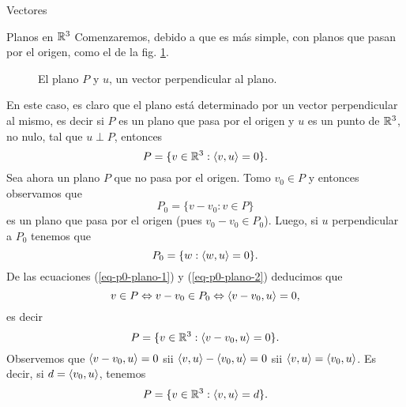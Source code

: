 \begin{chapter}{Vectores}
\begin{section}{Planos en $\mathbb R^3$}
        Comenzaremos, debido a que es más simple, con planos que  pasan por el origen,  como el de la fig. \ref{fig-plano-por-origen}.
        \begin{figure}[h]
        	\centering
            \caption{El plano $P$ y $u$, un vector  perpendicular al plano.}
            \label{fig-plano-por-origen}
        \end{figure} 
    
        En  este caso,  es claro que el plano está determinado por un vector perpendicular al mismo, es decir si $P$  es un plano que pasa por el origen y $u$ es un punto de $\mathbb R^3$, no nulo, tal que $u \perp P$,  entonces
        \begin{equation*}
            P = \{ v \in \mathbb R^3: \langle v,u \rangle=0 \}. 
        \end{equation*}
        Sea ahora un  plano $P$ que no pasa por el origen.  Tomo $v_0 \in P$ y entonces observamos que
        \begin{equation}\label{eq-p0-plano-1}
            P_0 = \{v-v_0: v \in P \}
        \end{equation} 
        es un plano que pasa por el origen (pues $v_0-v_0 \in P_0$). Luego,  si $u$ perpendicular a $P_0$ tenemos que
        \begin{equation}\label{eq-p0-plano-2}
        P_0 = \{w: \langle w,u \rangle=0\}.
        \end{equation}
        De las ecuaciones (\ref{eq-p0-plano-1}) y  (\ref{eq-p0-plano-2}) deducimos que 
        \begin{equation*}
            v \in P \Leftrightarrow v-v_0 \in P_0 \Leftrightarrow \langle v-v_0,u \rangle=0,
        \end{equation*}
         es decir
        \begin{equation*}
            P = \{ v \in \mathbb R^3: \langle v-v_0,u \rangle=0 \}. 
        \end{equation*}  
        Observemos que  $\langle v-v_0,u \rangle=0$ sii $\langle v,u \rangle-\langle v_0,u \rangle=0$ sii $\langle v,u \rangle=\langle v_0,u \rangle$. Es decir, si $d = \langle v_0,u \rangle$, tenemos
        \begin{equation*}
        P = \{ v \in \mathbb R^3: \langle v,u \rangle=d \}. 
        \end{equation*} 
        

\end{section}
\end{chapter}
